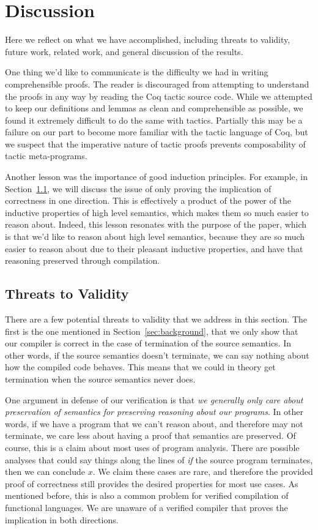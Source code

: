 \section{Discussion} \label{sec:discussion}

Here we reflect on what we have accomplished, including threats to validity,
future work, related work, and general discussion of the results.

One thing we'd like to communicate is the difficulty we had in writing
comprehensible proofs. The reader is discouraged from attempting to understand
the proofs in any way by reading the Coq tactic source code. While we attempted
to keep our definitions and lemmas as clean and comprehensible as possible, we
found it extremely difficult to do the same with tactics. Partially this may be
a failure on our part to become more familiar with the tactic language of Coq,
but we suspect that the imperative nature of tactic proofs prevents
composability of tactic meta-programs. 

Another lesson was the importance of good induction principles. For example, in
Section~\ref{sec:threats}, we will discuss the issue of only proving the
implication of correctness in one direction. This is effectively a product of
the power of the inductive properties of high level semantics, which makes them
so much easier to reason about. Indeed, this lesson resonates with the purpose
of the paper, which is that we'd like to reason about high level semantics,
because they are so much easier to reason about due to their pleasant inductive
properties, and have that reasoning preserved through compilation. 

\subsection{Threats to Validity} \label{sec:threats}

There are a few potential threats to validity that we address in this section. The
first is the one mentioned in Section~\ref{sec:background}, that we only show
that our compiler is correct in the case of termination of the source semantics.
In other words, if the source semantics doesn't terminate, we can say nothing
about how the compiled code behaves. This means that we could in theory get
termination when the source semantics never does. 

One argument in defense of our verification is that \emph{we generally only care
about preservation of semantics for preserving reasoning about our programs}. In
other words, if we have a program that we can't reason about, and therefore may
not terminate, we care less about having a proof that semantics are preserved.
Of course, this is a claim about most uses of program analysis. There are
possible analyses that could say things along the lines of \emph{if} the source
program terminates, then we can conclude $x$. We claim these cases are rare, and
therefore the provided proof of correctness still provides the desired
properties for most use cases. As mentioned before, this is also a common
problem for verified compilation of functional languages. We are unaware of a
verified compiler that proves the implication in both directions. 

